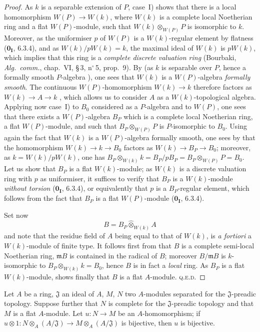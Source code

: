 \begin{proof}
As $k$ is a separable extension of $P$, case~I) shows that there is a local homomorphism $W(P)\to W(k)$, where $W(k)$ is a complete local Noetherian ring and a flat $W(P)$-module, such that $W(k)\otimes_{W(P)}P$ is isomorphic to $k$.
Moreover, as the uniformiser $p$ of $W(P)$ is a $W(k)$-regular element by flatness ($\mathbf{0_I}$, 6.3.4), and as
$W(k)/pW(k)=k$, the maximal ideal of $W(k)$ is $pW(k)$, which implies that this ring is a \emph{complete discrete valuation ring} (Bourbaki, \emph{Alg.\ comm.}, chap.~VI, \S\,3, n$^\circ$\,5, prop.~9).
By  (as $k$ is separable over $P$, hence a formally smooth $P$-algebra ), one sees that $W(k)$ is a $W(P)$-algebra \emph{formally smooth}.
The continuous $W(P)$-homomorphism $W(k)\to k$ therefore factors as $W(k)\to A\to k$ ,
which allows us to consider $A$ as a $W(k)$-topological algebra.
Applying now case~I) to $B_0$ considered as a $P$-algebra and to $W(P)$, one sees that there exists a $W(P)$-algebra $B_P$ which is a complete local Noetherian ring, a flat $W(P)$-module, and such that $B_P\otimes_{W(P)}P$ is $P$-isomorphic to $B_0$.
Using again the fact that $W(k)$ is a $W(P)$-algebra formally smooth, one sees by  that the homomorphism $W(k)\to k\to B_0$ factors as $W(k)\to B_P\to B_0$; moreover, as $k=W(k)/pW(k)$, one has $B_P\otimes_{W(k)}k = B_P/pB_P = B_P\otimes_{W(P)}P = B_0$.
Let us show that $B_P$ is a flat $W(k)$-module; as $W(k)$ is a discrete valuation ring with $p$ as uniformiser, it suffices to verify that $B_P$ is a $W(k)$-module \emph{without torsion} ($\mathbf{0_I}$, 6.3.4), or equivalently that $p$ is a $B_P$-regular element, which follows from the fact that $B_P$ is a flat $W(P)$-module ($\mathbf{0_I}$, 6.3.4).

Set now
\[
  B = B_P\widehat{\otimes}_{W(k)} A
\]
and note that the residue field of $A$ being equal to that of $W(k)$, is \emph{a fortiori} a $W(k)$-module of finite type.
It follows first from  that $B$ is a complete semi-local Noetherian ring, $\mathfrak{m}B$ is contained in the radical of $B$; moreover $B/\mathfrak{m}B$ is $k$-isomorphic to $B_P\otimes_{W(k)}k = B_0$, hence $B$ is in fact a \emph{local} ring.
As $B_P$ is a flat $W(k)$-module,  shows finally that $B$ is a flat $A$-module. \textsc{q.e.d.}
\end{proof}

\begin{lemma}[19.7.1.4]
\label{0.19.7.1.4}
Let $A$ be a ring, $\mathfrak{J}$ an ideal of $A$, $M$, $N$ two $A$-modules separated for the $\mathfrak{J}$-preadic topology.
Suppose further that $N$ is complete for the $\mathfrak{J}$-preadic topology and that $M$ is a flat $A$-module.
Let $u:N\to M$ be an $A$-homomorphism; if $u\otimes 1:N\otimes_A(A/\mathfrak{J})\to M\otimes_A(A/\mathfrak{J})$ is bijective, then $u$ is bijective.
\end{lemma}

